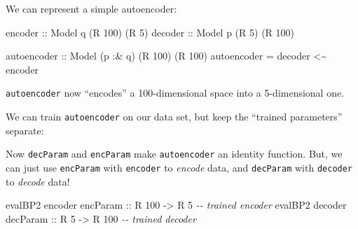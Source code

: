 \documentclass[]{article}
\newenvironment{Shaded}{}{}
\newcommand{\CommentTok}[1]{\textcolor[rgb]{0.38,0.63,0.69}{\textit{#1}}}
\newcommand{\DataTypeTok}[1]{\textcolor[rgb]{0.56,0.13,0.00}{#1}}
\newcommand{\DecValTok}[1]{\textcolor[rgb]{0.25,0.63,0.44}{#1}}
\newcommand{\FunctionTok}[1]{\textcolor[rgb]{0.02,0.16,0.49}{#1}}
\newcommand{\NormalTok}[1]{#1}
\newcommand{\OperatorTok}[1]{\textcolor[rgb]{0.40,0.40,0.40}{#1}}
\newcommand{\OtherTok}[1]{\textcolor[rgb]{0.00,0.44,0.13}{#1}}
\begin{document}
We can represent a simple autoencoder:

\begin{Shaded}
\begin{Highlighting}[]
\OtherTok{encoder ::} \DataTypeTok{Model}\NormalTok{ q (}\DataTypeTok{R} \DecValTok{100}\NormalTok{) (}\DataTypeTok{R} \DecValTok{5}\NormalTok{)}
\OtherTok{decoder ::} \DataTypeTok{Model}\NormalTok{ p (}\DataTypeTok{R} \DecValTok{5}\NormalTok{)   (}\DataTypeTok{R} \DecValTok{100}\NormalTok{)}

\OtherTok{autoencoder ::} \DataTypeTok{Model}\NormalTok{ (p }\OperatorTok{:\&}\NormalTok{ q) (}\DataTypeTok{R} \DecValTok{100}\NormalTok{) (}\DataTypeTok{R} \DecValTok{100}\NormalTok{)}
\NormalTok{autoencoder }\OtherTok{=}\NormalTok{ decoder }\OperatorTok{\textless{}\textasciitilde{}}\NormalTok{ encoder}
\end{Highlighting}
\end{Shaded}

\texttt{autoencoder} now ``encodes'' a 100-dimensional space into a
5-dimensional one.

We can train \texttt{autoencoder} on our data set, but keep the ``trained
parameters'' separate:

\begin{Shaded}
\end{Shaded}

Now \texttt{decParam} and \texttt{encParam} make \texttt{autoencoder} an
identity function. But, we can just use \texttt{encParam} with \texttt{encoder}
to \emph{encode} data, and \texttt{decParam} with \texttt{decoder} to
\emph{decode} data!

\begin{Shaded}
\begin{Highlighting}[]
\NormalTok{evalBP2 encoder}\OtherTok{ encParam ::} \DataTypeTok{R} \DecValTok{100} \OtherTok{{-}\textgreater{}} \DataTypeTok{R} \DecValTok{5}        \CommentTok{{-}{-} trained encoder}
\NormalTok{evalBP2 decoder}\OtherTok{ decParam ::} \DataTypeTok{R} \DecValTok{5}   \OtherTok{{-}\textgreater{}} \DataTypeTok{R} \DecValTok{100}      \CommentTok{{-}{-} trained decoder}
\end{Highlighting}
\end{Shaded}
\end{document}
